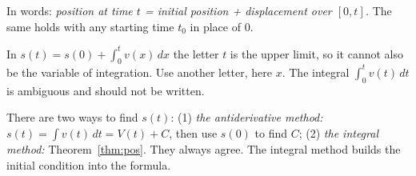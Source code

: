\documentclass[11pt]{article}
\begin{document}
In words: \emph{position at time $t$ = initial position + displacement over $[0,t]$.} The same holds with any starting time $t_0$ in place of $0$.

\begin{warn}
In $s(t)=s(0)+\int_0^tv(x)\,dx$ the letter $t$ is the upper limit, so it cannot also be the variable of integration. Use another letter, here $x$. The integral $\int_0^tv(t)\,dt$ is ambiguous and should not be written.
\end{warn}

There are two ways to find $s(t)$: (1) \emph{the antiderivative method:} $s(t)=\int v(t)\,dt=V(t)+C$, then use $s(0)$ to find $C$; (2) \emph{the integral method:} Theorem~\ref{thm:pos}. They always agree. The integral method builds the initial condition into the formula.
\end{document}

